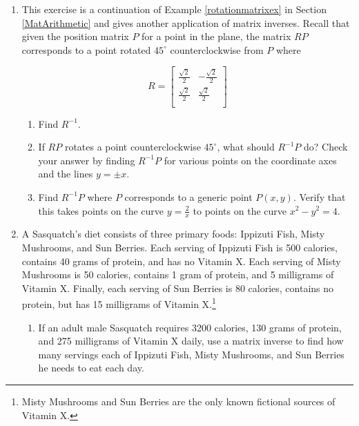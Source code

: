 \documentclass{ximera}
\begin{document}
\begin{enumerate}
\setcounter{enumi}{\value{HW}}

\item  This exercise is a continuation of Example \ref{rotationmatrixex} in Section \ref{MatArithmetic} and gives another application of matrix inverses.  Recall that given the position matrix $P$ for a point in the plane, the matrix $RP$ corresponds to a point rotated $45^{\circ}$ counterclockwise from $P$ where
 
\[R = \left[ \begin{array}{rr} \frac{\sqrt{2}}{2} & -\frac{\sqrt{2}}{2} \\[3pt] \frac{\sqrt{2}}{2} & \frac{\sqrt{2}}{2} \\ \end{array} \right]\]
 
\begin{enumerate}

\item  Find $R^{-1}$.
\item  If $RP$ rotates a point counterclockwise $45^{\circ}$, what should $R^{-1}P$ do?  Check your answer by finding $R^{-1}P$ for various points on the coordinate axes and the lines $y=\pm x$.
\item  Find $R^{-1}P$ where $P$ corresponds to a generic point $P(x,y)$. Verify that this takes points on the curve $y=\frac{2}{x}$ to points on the curve $x^2-y^2=4$.

\end{enumerate}

\item \label{SasquatchDiet} A Sasquatch's diet consists of three primary foods:  Ippizuti Fish, Misty Mushrooms, and Sun Berries.  Each serving of Ippizuti Fish is 500 calories, contains 40 grams of protein, and has no Vitamin X.  Each serving of Misty Mushrooms is 50 calories, contains 1 gram of protein, and 5 milligrams of Vitamin X.  Finally, each serving of Sun Berries is 80 calories, contains no protein, but has 15 milligrams of Vitamin X.\footnote{Misty Mushrooms and Sun Berries are the only known fictional sources of Vitamin X.}

\begin{enumerate}

\item  If an adult male Sasquatch requires 3200 calories, 130 grams of protein, and 275 milligrams of Vitamin X daily, use a matrix inverse to find how many servings each of Ippizuti Fish, Misty Mushrooms, and Sun Berries he needs to eat each day.


\end{enumerate}
\end{enumerate}
\end{document}
